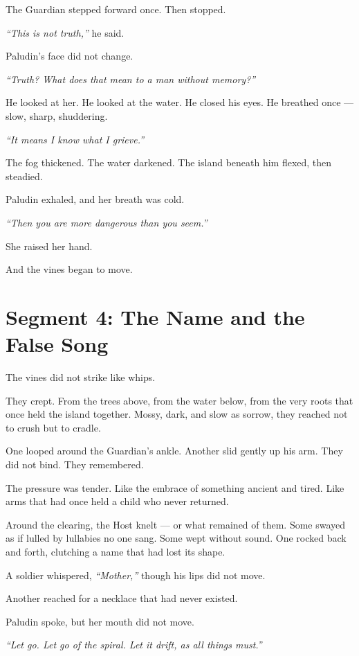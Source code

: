 \documentclass[9pt]{article}
\begin{document}
The Guardian stepped forward once. Then stopped.

\textit{``This is not truth,''} he said.

Paludin’s face did not change.

\textit{``Truth? What does that mean to a man without memory?''}

He looked at her. He looked at the water. He closed his eyes. He breathed once — slow, sharp, shuddering.

\textit{``It means I know what I grieve.''}

The fog thickened. The water darkened. The island beneath him flexed, then steadied.

Paludin exhaled, and her breath was cold.

\textit{``Then you are more dangerous than you seem.''}

She raised her hand.

And the vines began to move.

\newpage

\section*{Segment 4: The Name and the False Song}

The vines did not strike like whips.

They crept. From the trees above, from the water below, from the very roots that once held the island together. Mossy, dark, and slow as sorrow, they reached not to crush but to cradle.

One looped around the Guardian’s ankle. Another slid gently up his arm. They did not bind. They remembered.

The pressure was tender. Like the embrace of something ancient and tired. Like arms that had once held a child who never returned.

Around the clearing, the Host knelt — or what remained of them. Some swayed as if lulled by lullabies no one sang. Some wept without sound. One rocked back and forth, clutching a name that had lost its shape.

A soldier whispered, \textit{“Mother,”} though his lips did not move.

Another reached for a necklace that had never existed.

Paludin spoke, but her mouth did not move.

\textit{``Let go. Let go of the spiral. Let it drift, as all things must.''}
\end{document}
